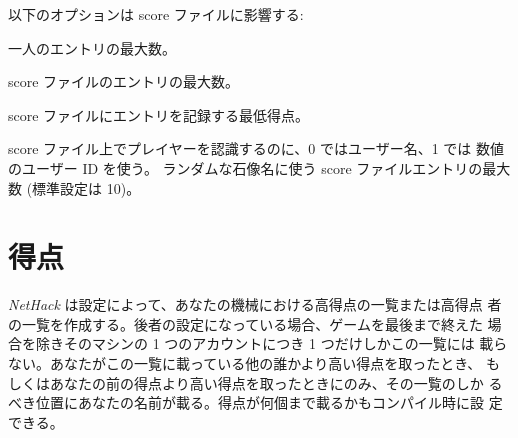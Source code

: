 以下のオプションは score ファイルに影響する:
\blist {}
\item[\ib{PERSMAX}]
一人のエントリの最大数。
\item[\ib{ENTRYMAX}]
score ファイルのエントリの最大数。
\item[\ib{POINTSMIN}]
score ファイルにエントリを記録する最低得点。
\item[\ib{PERS\verb+_+IS\verb+_+UID}]
score ファイル上でプレイヤーを認識するのに、0 ではユーザー名、1 では
数値のユーザー ID を使う。
ランダムな石像名に使う score ファイルエントリの最大数 (標準設定は 10)。
\elist

\section{得点}

{\it NetHack\/} は設定によって、あなたの機械における高得点の一覧または高得点
者の一覧を作成する。後者の設定になっている場合、ゲームを最後まで終えた
場合を除きそのマシンの 1 つのアカウントにつき 1 つだけしかこの一覧には
載らない。あなたがこの一覧に載っている他の誰かより高い得点を取ったとき、
もしくはあなたの前の得点より高い得点を取ったときにのみ、その一覧のしか
るべき位置にあなたの名前が載る。得点が何個まで載るかもコンパイル時に設
定できる。

